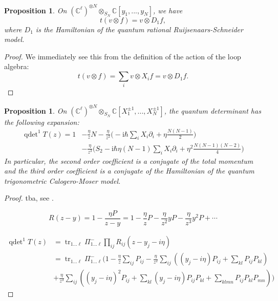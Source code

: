 \documentclass[11pt]{report}
\newtheorem{prop}[theorem]{Proposition}
\theoremstyle{definition}
\theoremstyle{remark}
\theoremstyle{remark}
\newcommand{\C}{\mathbb{C}}
\newcommand{\I}{\mathrm{i}}
\begin{document}
\begin{prop}
On $(\C^\ell)^{\otimes N} \otimes_{S_N} \C[y_1,...,y_N]$, we have
\begin{equation*}
t(v \otimes f) = v \otimes D_1 f,
\end{equation*}
where $D_1$ is the Hamiltonian of the quantum rational Ruijsenaars-Schneider model.
\end{prop}

\begin{proof}
We immediately see this from the definition of the action of the loop algebra:
\begin{equation*}
t(v \otimes f) = \sum_i v \otimes X_i f = v \otimes D_1 f.
\end{equation*}
\end{proof}

\begin{prop}
On $(\C^\ell)^{\otimes N} \otimes_{S_N} \C[X_1^{\pm 1},...,X_N^{\pm 1}]$, the quantum determinant has the following expansion:
\begin{align*}
\operatorname{qdet}^1 T(z)
= 1 &- \frac{\eta}{z} N - \frac{\eta}{z^2} \bigg( -\I \hbar \sum_i X_i \partial_i + \eta \frac{N(N-1)}{2} \bigg) \\
&- \frac{\eta}{z^3} \bigg( S_2 - \I \hbar \eta (N-1) \sum_i X_i \partial_i + \eta^2 \frac{N(N-1)(N-2)}{4} \bigg)
\end{align*}
In particular, the second order coefficient is a conjugate of the total momentum and the third order coefficient is a conjugate of the Hamiltonian of the quantum trigonometric Calogero-Moser model.
\end{prop}

\begin{proof}
tba, see \cite{article:bernard:1993}.

\begin{equation*}
R(z-y) = 1 - \frac{\eta P}{z-y} = 1 - \frac{\eta}{z} P - \frac{\eta}{z^2} y P - \frac{\eta}{z^3} y^2 P + \cdots
\end{equation*}

\begin{align*}
\operatorname{qdet}^1 T(z)
&= \operatorname{tr}_{1...\ell} \Pi_{1...\ell}^- \prod_{ij} R_{ij}(z-y_j-i\eta) \\
&= \operatorname{tr}_{1...\ell} \Pi_{1...\ell}^- ( 1
- \frac{\eta}{z} \sum_{ij} P_{ij}
- \frac{\eta}{z^2} \sum_{ij} \left( (y_j-i\eta) P_{ij} + \sum_{kl} P_{ij} P_{kl} \right) \\
&+ \frac{\eta}{z^3} \sum_{ij} \left( (y_j-i\eta)^2 P_{ij} + \sum_{kl} (y_j-i\eta) P_{ij} P_{kl} + \sum_{klmn} P_{ij} P_{kl} P_{mn} \right) )
\end{align*}
\end{proof}
\end{document}
